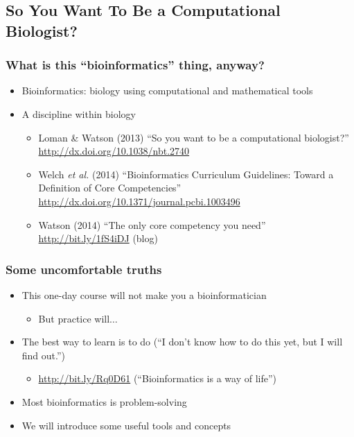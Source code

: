%

\subsection{So You Want To Be a Computational Biologist?}
\begin{frame}
  \frametitle{What is this ``bioinformatics'' thing, anyway?}
  \begin{itemize}
    \item Bioinformatics: biology using computational and mathematical tools
    \item A discipline within biology
    \begin{itemize}
      \item Loman \& Watson (2013) ``So you want to be a computational biologist?''
        \url{http://dx.doi.org/10.1038/nbt.2740}
      \item Welch \textit{et al.} (2014) ``Bioinformatics Curriculum Guidelines: Toward a Definition of Core Competencies''
      \url{http://dx.doi.org/10.1371/journal.pcbi.1003496}
      \item Watson (2014) ``The only core competency you need'' \url{http://bit.ly/1fS4iDJ} (blog)
    \end{itemize}
  \end{itemize}
\end{frame}

\begin{frame}
  \frametitle{Some uncomfortable truths}
  \begin{itemize}
    \item<1-> This one-day course will not make you a bioinformatician
    \begin{itemize}
      \item<2-> But practice will$\ldots$
    \end{itemize}
    \item<3-> The best way to learn is to do (``I don't know how to do this yet, but I will find out.'')
    \begin{itemize}
      \item \url{http://bit.ly/Rq0D61} (``Bioinformatics is a way of life'')
    \end{itemize}
    \item<3-> Most bioinformatics is problem-solving
    \item<3-> We will introduce some useful tools and concepts
  \end{itemize}
\end{frame}

